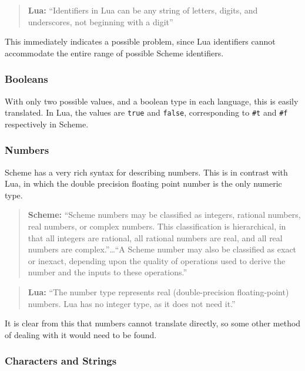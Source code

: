 \begin{quote}\textbf{Lua:}
``Identifiers in Lua can be any string of letters, digits, and
underscores, not beginning with a digit''~\cite[p.5]{luabook}
\end{quote}

This immediately indicates a possible problem, since Lua identifiers cannot
accommodate the entire range of possible Scheme identifiers.

\subsubsection{Booleans}

With only two possible values, and a boolean type in each language, this is
easily translated. In Lua, the values are \texttt{true} and \texttt{false},
corresponding to \texttt{\#t} and \texttt{\#f} respectively in Scheme.

\subsubsection{Numbers}

Scheme has a very rich syntax for describing numbers. This is in contrast with
Lua, in which the double precision floating point number is the only
numeric type.

\begin{quote}\textbf{Scheme:}
``Scheme numbers may be classified as integers, rational numbers, real numbers,
or complex numbers. This classification is hierarchical, in that all integers
are rational, all rational numbers are real, and all real numbers are
complex.''\ldots ``A Scheme number may also be classified as exact or inexact,
depending upon the quality of operations used to derive the number and the
inputs to these operations.''~\cite[Sec~6.4]{tspl}
\end{quote}

\begin{quote}\textbf{Lua:}
``The number type represents real (double-precision floating-point) numbers. Lua
has no integer type, as it does not need it.''~\cite[p.10]{luabook}
\end{quote}

It is clear from this that numbers cannot translate directly, so some other
method of dealing with it would need to be found.

\subsubsection{Characters and Strings}

